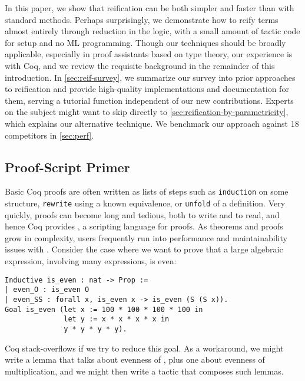In this paper, we show that reification can be both simpler and faster than with standard methods.
Perhaps surprisingly, we demonstrate how to reify terms almost entirely through reduction in the logic, with a small amount of tactic code for setup and no ML programming.
Though our techniques should be broadly applicable, especially in proof assistants based on type theory, our experience is with Coq, and we review the requisite background in the remainder of this introduction.
In \autoref{sec:reif-survey}, we summarize our survey into prior approaches to reification and provide high-quality implementations and documentation for them, serving a tutorial function independent of our new contributions.
Experts on the subject might want to skip directly to \autoref{sec:reification-by-parametricity}, which explains our alternative technique.
We benchmark our approach against 18 competitors in \autoref{sec:perf}.

\subsection{Proof-Script Primer}
Basic Coq proofs are often written as lists of steps such as \texttt{induction} on some structure, \texttt{rewrite} using a known equivalence, or \texttt{unfold} of a definition.
Very quickly, proofs can become long and tedious, both to write and to read, and hence Coq provides \Ltac, a scripting language for proofs.
As theorems and proofs grow in complexity, users frequently run into performance and maintainability issues with \Ltac.
Consider the case where we want to prove that a large algebraic expression, involving many \space expressions, is even:
\begin{verbatim}
Inductive is_even : nat -> Prop :=
| even_O : is_even O
| even_SS : forall x, is_even x -> is_even (S (S x)).
Goal is_even (let x := 100 * 100 * 100 * 100 in
              let y := x * x * x * x in
              y * y * y * y).
\end{verbatim}
Coq stack-overflows if we try to reduce this goal.
As a workaround, we might write a lemma that talks about evenness of , plus one about evenness of multiplication, and we might then write a tactic that composes such lemmas.

